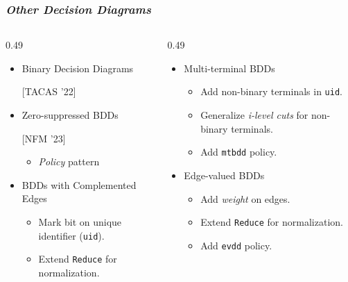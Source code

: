 \documentclass[english, aspectratio=169]{beamer}
\begin{document}
\begin{frame}
  \frametitle{\secname\quad \emph{Other Decision Diagrams}}

  \begin{columns}
    \begin{column}[t]{0.49\linewidth}

      \begin{itemize}
      \item[\faIcon{check-circle}] Binary Decision Diagrams

        [TACAS '22]
      \item[\faIcon{check-circle}] Zero-suppressed BDDs

        [NFM '23]
        \begin{itemize}
        \item \emph{Policy} pattern
        \end{itemize}
      \item[\faIcon{circle}] BDDs with Complemented Edges
        \begin{itemize}
        \item Mark bit on unique identifier (\texttt{uid}).
        \item Extend \texttt{Reduce} for normalization.
        \end{itemize}
      \end{itemize}

    \end{column}
    \begin{column}[t]{0.49\linewidth}

      \begin{itemize}
      \item[\faIcon{circle}] Multi-terminal BDDs
        \begin{itemize}
        \item Add non-binary terminals in \texttt{uid}.
        \item Generalize \emph{i-level cuts} for non-binary terminals.
        \item Add \texttt{mtbdd} policy.
        \end{itemize}
      \item[\faIcon{circle}] Edge-valued BDDs
        \begin{itemize}
        \item Add \emph{weight} on edges.
        \item Extend \texttt{Reduce} for normalization.
        \item Add \texttt{evdd} policy.
        \end{itemize}
      \end{itemize}

    \end{column}
  \end{columns}
\end{frame}

\blankframe


\end{document}
